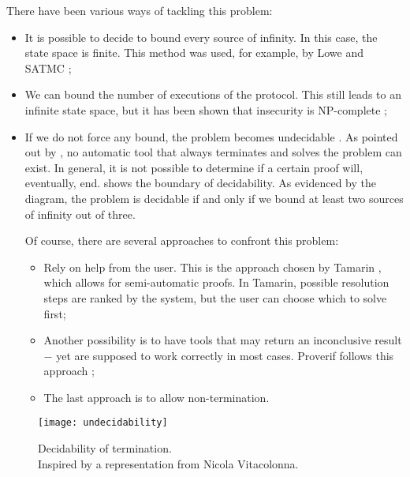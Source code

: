There have been various ways of tackling this problem:
\begin{itemize}
    \item{It is possible to decide to bound every source of infinity. In this case, the state space is finite. This method was used, for example, by Lowe \cite{LoweNeedhamSchroederPK} and SATMC \cite{SATMC};}

    \item{We can bound the number of executions of the protocol. This still leads to an infinite state space, but it has been shown that insecurity is NP-complete \cite{SymbolicModelNPCompleteInsecurity};}

    \item{If we do not force any bound, the problem becomes undecidable \cite{SymbolicModelUndecidability1} \cite{SymbolicModelUndecidability2}. As pointed out by \BLANC{} \cite{SymbolicVerificationBlanchet}, no automatic tool that always terminates and solves the problem can exist. In general, it is not possible to determine if a certain proof will, eventually, end.  shows the boundary of decidability. As evidenced by the diagram, the problem is decidable if and only if we bound at least two sources of infinity out of three.

                Of course, there are several approaches to confront this problem:

                \begin{itemize}
                    \label{item:undecidability_approaches}
                    \item{Rely on help from the user. This is the approach chosen by Tamarin \cite{TamarinFoundations}, which allows for semi-automatic proofs. In Tamarin, possible resolution steps are ranked by the system, but the user can choose which to solve first;}
                    \item{Another possibility is to have tools that may return an inconclusive result $-$ yet are supposed to work correctly in most cases. Proverif follows this approach \cite{SymbolicVerificationBlanchet};}
                    \item{The last approach is to allow non-termination.}
                \end{itemize}
          }
\end{itemize}


\begin{figure}[t]
    \texttt{[image: undecidability]}
    \centering
    \caption{Decidability of termination.\\Inspired by a representation from Nicola Vitacolonna.}
    \label{fig:undecidability}
\end{figure}